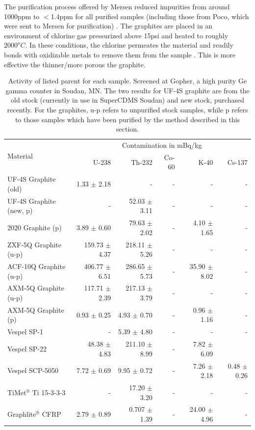 \documentclass{report}
\begin{document}
The purification process offered by Mersen reduced impurities from around 1000ppm to $<$1.4ppm for all purified samples (including those from Poco, which were sent to Mersen for purification) \cite{Mersen_conv}. The graphites are placed in an environment of chlorine gas pressurized above 15psi and heated to roughly $2000^{o}C$. In these conditions, the chlorine permeates the material and readily bonds with oxidizable metals to remove them from the sample \cite{Olivier_conv}. This is more effective the thinner/more porous the graphite.

\begin{table}[htb]
\centering
\begin{threeparttable}
\begin{tabular}{l|rrrrr}
\multirow{2}{*}{\large{Material}} & \multicolumn{5}{c}{Contamination in mBq/kg}\\
& U-238 & Th-232 & Co-60 & K-40 & Cs-137 \\\toprule
UF-4S Graphite (old) & 1.33 $\pm$ 2.18 & - & - & - & -\\
UF-4S Graphite (new, p) & - & 52.03 $\pm$ 3.11 &- & -& - \\
2020 Graphite (p) & 3.89 $\pm$ 0.60 & 79.63 $\pm$ 2.02 &- & 4.10 $\pm$ 1.65 &- \\
ZXF-5Q Graphite (u-p) & 159.73 $\pm$ 4.37 & 218.11 $\pm$ 5.26 & - & - & - \\
ACF-10Q Graphite (u-p) & 406.77 $\pm$ 6.51 & 286.65 $\pm$ 5.73 & -& 35.90 $\pm$ 8.02 &-\\
AXM-5Q Graphite (u-p) & 117.71 $\pm$ 2.39 & 217.13 $\pm$ 3.79 &- & -&-  \\
AXM-5Q Graphite (p) & 0.93 $\pm$ 0.25 & 4.93 $\pm$ 0.70 & -& 0.96 $\pm$ 1.16 & - \\
Vespel SP-1 & -& 5.39 $\pm$ 4.80 & -& -&-  \\
Vespel SP-22 & 48.38 $\pm$ 4.83 & 211.10 $\pm$ 8.99 &- & 7.82 $\pm$ 6.09 &\\
Vespel SCP-5050 & 7.72 $\pm$ 0.69 & 9.95 $\pm$ 0.72 &- & 7.26 $\pm$ 2.18 & 0.48 $\pm$ 0.26 \\
TiMet$^{\circledR}$ Ti 15-3-3-3 & -& 17.20 $\pm$ 3.20 &- &- & - \\
Graphlite$^{\circledR}$ CFRP & 2.79 $\pm$ 0.89 & 0.707 $\pm$ 1.39 &- & 24.00 $\pm$ 4.96 & -\\

\end{tabular}
\caption{Activity of listed parent for each sample. Screened at Gopher, a high purity Ge
gamma counter in Soudan, MN. The two results for UF-4S graphite are from the old stock (currently in use in SuperCDMS Soudan) and new stock, purchased recently. For the graphites, u-p refers to unpurified stock samples, while p refers to those samples which have been purified by the method described in this section.}
\end{threeparttable}
\end{table}
\end{document}
